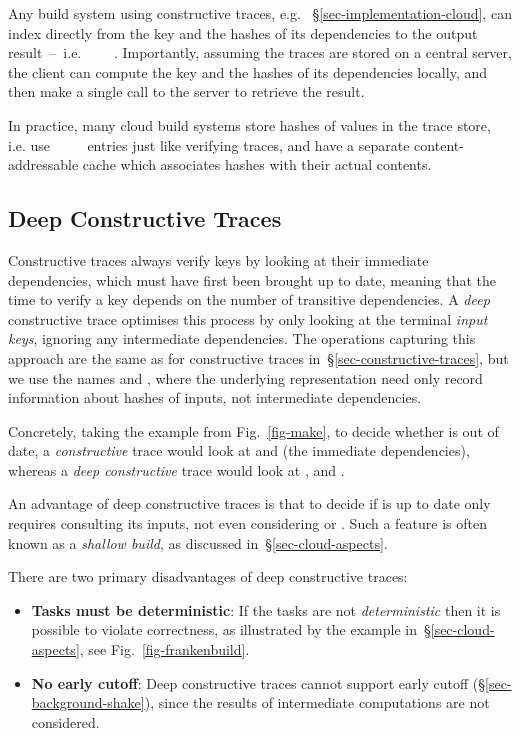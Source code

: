 Any  build system using constructive traces, e.g.
\CloudBuild~\S\ref{sec-implementation-cloud}, can index directly from the
key and the hashes of its dependencies to the output result~--~i.e.
~~\hs{[Hash}~\hs{v])}~. Importantly, assuming the traces
are stored on a central server, the client can compute the key and the hashes of
its dependencies locally, and then make a single call to the server to retrieve
the result.

In practice, many cloud build systems store hashes of values in the trace store,
i.e. use ~~~~ entries just like
verifying traces, and have a separate content-addressable cache which associates
hashes with their actual contents.

\subsection{Deep Constructive Traces}\label{sec-deep-constructive-traces}

Constructive traces always verify keys by looking at their immediate
dependencies, which must have first been brought up to date, meaning that the
time to verify a key depends on the number of transitive dependencies. A
\emph{deep} constructive trace optimises this process by only looking at the
terminal \emph{input keys}, ignoring any intermediate dependencies. The operations
capturing this approach are the same as for constructive traces
in~\S\ref{sec-constructive-traces}, but we use the names  and
, where the underlying  representation need only record
information about hashes of inputs, not intermediate dependencies.

Concretely, taking the example from Fig.~\ref{fig-make}, to decide whether
 is out of date, a \emph{constructive} trace would look at
 and  (the immediate dependencies), whereas a
\emph{deep constructive} trace would look at ,  and
.

An advantage of deep constructive traces is that to decide if  is
up to date only requires consulting its inputs, not even considering
 or . Such a feature is often known as a
\emph{shallow build}, as discussed in~\S\ref{sec-cloud-aspects}.

There are two primary disadvantages of deep constructive traces:

\begin{itemize}
  \item \textbf{Tasks must be deterministic}: If the tasks are not
        \emph{deterministic} then it is possible to violate correctness, as
        illustrated by the example in~\S\ref{sec-cloud-aspects}, see
        Fig.~\ref{fig-frankenbuild}.
  \item \textbf{No early cutoff}: Deep constructive traces cannot support early
        cutoff (\S\ref{sec-background-shake}), since the results of intermediate
        computations are not considered.
\end{itemize}

